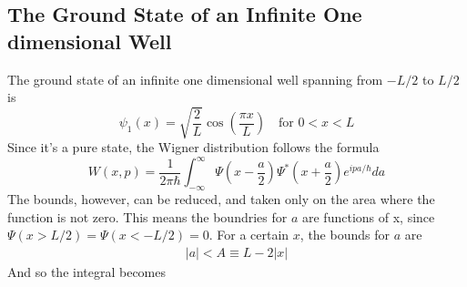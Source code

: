 \documentclass{article}
\begin{document}
\subsection{The Ground State of an Infinite One dimensional Well}
The ground state of an infinite one dimensional well spanning from $-L/2$ to $L/2$ is
\begin{equation}
    \psi_1(x) = \sqrt{\frac{2}{L}} \cos\left(\frac{\pi x}{L}\right) \quad \text{for } 0 < x < L
\end{equation}
Since it's a pure state, the Wigner distribution follows the formula
\begin{equation}
    W(x, p) = \frac{1}{2\pi\hbar} \int_{-\infty}^{\infty} \Psi\left(x - \frac{a}{2}\right) \Psi^* \left(x + \frac{a}{2}\right) e^{ipa/\hbar}da
\end{equation}
The bounds, however, can be reduced, and taken only on the area where the function is not zero. This means the boundries for $a$ are functions of x, since $\Psi(x > L/2) = \Psi(x < -L/2) = 0$. For a certain $x$, the bounds for $a$ are
\begin{equation}
\begin{gathered}
    |a| < A \equiv L - 2 |x|
\end{gathered}
\end{equation}
And so the integral becomes
\end{document}
